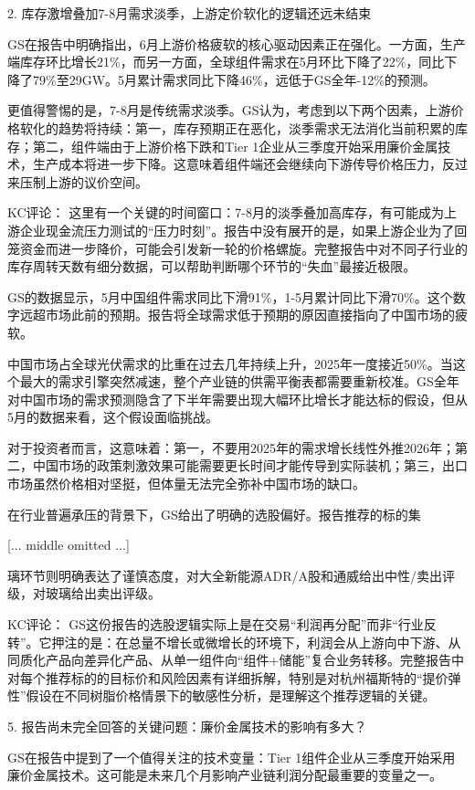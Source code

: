 \documentclass[11pt]{ctexart}
\begin{document}
2. 库存激增叠加7-8月需求淡季，上游定价软化的逻辑还远未结束

GS在报告中明确指出，6月上游价格疲软的核心驱动因素正在强化。一方面，生产端库存环比增长21\%，而另一方面，全球组件需求在5月环比下降了22\%，同比下降了79\%至29GW。5月累计需求同比下降46\%，远低于GS全年-12\%的预测。

更值得警惕的是，7-8月是传统需求淡季。GS认为，考虑到以下两个因素，上游价格软化的趋势将持续：第一，库存预期正在恶化，淡季需求无法消化当前积累的库存；第二，组件端由于上游价格下跌和Tier 1企业从三季度开始采用廉价金属技术，生产成本将进一步下降。这意味着组件端还会继续向下游传导价格压力，反过来压制上游的议价空间。

KC评论： 这里有一个关键的时间窗口：7-8月的淡季叠加高库存，有可能成为上游企业现金流压力测试的“压力时刻”。报告中没有展开的是，如果上游企业为了回笼资金而进一步降价，可能会引发新一轮的价格螺旋。完整报告中对不同子行业的库存周转天数有细分数据，可以帮助判断哪个环节的“失血”最接近极限。

GS的数据显示，5月中国组件需求同比下滑91\%，1-5月累计同比下滑70\%。这个数字远超市场此前的预期。报告将全球需求低于预期的原因直接指向了中国市场的疲软。

中国市场占全球光伏需求的比重在过去几年持续上升，2025年一度接近50\%。当这个最大的需求引擎突然减速，整个产业链的供需平衡表都需要重新校准。GS全年对中国市场的需求预测隐含了下半年需要出现大幅环比增长才能达标的假设，但从5月的数据来看，这个假设面临挑战。

对于投资者而言，这意味着：第一，不要用2025年的需求增长线性外推2026年；第二，中国市场的政策刺激效果可能需要更长时间才能传导到实际装机；第三，出口市场虽然价格相对坚挺，但体量无法完全弥补中国市场的缺口。

在行业普遍承压的背景下，GS给出了明确的选股偏好。报告推荐的标的集

[... middle omitted ...]

璃环节则明确表达了谨慎态度，对大全新能源ADR/A股和通威给出中性/卖出评级，对玻璃给出卖出评级。

KC评论： GS这份报告的选股逻辑实际上是在交易“利润再分配”而非“行业反转”。它押注的是：在总量不增长或微增长的环境下，利润会从上游向中下游、从同质化产品向差异化产品、从单一组件向“组件+储能”复合业务转移。完整报告中对每个推荐标的的目标价和风险因素有详细拆解，特别是对杭州福斯特的“提价弹性”假设在不同树脂价格情景下的敏感性分析，是理解这个推荐逻辑的关键。

5. 报告尚未完全回答的关键问题：廉价金属技术的影响有多大？

GS在报告中提到了一个值得关注的技术变量：Tier 1组件企业从三季度开始采用廉价金属技术。这可能是未来几个月影响产业链利润分配最重要的变量之一。
\end{document}

